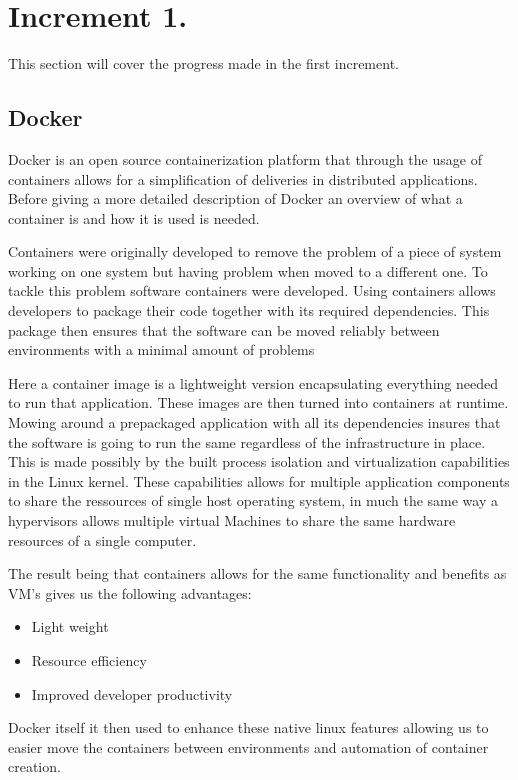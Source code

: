 \section{Increment 1.}
This section will cover the progress made in the first increment. 


\subsection{Docker}
Docker is an open source containerization platform that through the usage of containers allows for a simplification of deliveries in distributed applications. 
Before giving a more detailed description of Docker an overview of what a container is and how it is used is needed. 


Containers were originally developed to remove the problem of a piece of system working on one system but having problem when moved to a different one. 
To tackle this problem software containers were developed. 
Using containers allows developers to package their code together with its required dependencies. This package then ensures that the software can be moved reliably between environments with a minimal amount of problems


Here a container image is a lightweight version encapsulating everything needed to run that application. These images are then turned into containers at runtime. 
Mowing around a prepackaged application with all its dependencies insures that the software is going to run the same regardless of the infrastructure in place. 
This is made possibly by the built process isolation and virtualization capabilities in the Linux kernel. 
These capabilities allows for multiple application components to share the ressources of single host operating system, 
in much the same way a hypervisors allows multiple virtual Machines to share the same hardware resources of a single computer. 


The result being that containers allows for the same functionality and benefits as VM’s gives us the following advantages:

\begin{itemize}
    \item Light weight 
    \item Resource efficiency
    \item Improved developer productivity
\end{itemize}

Docker itself it then used to enhance these native linux features allowing us to easier move the containers between environments and automation of container creation.

